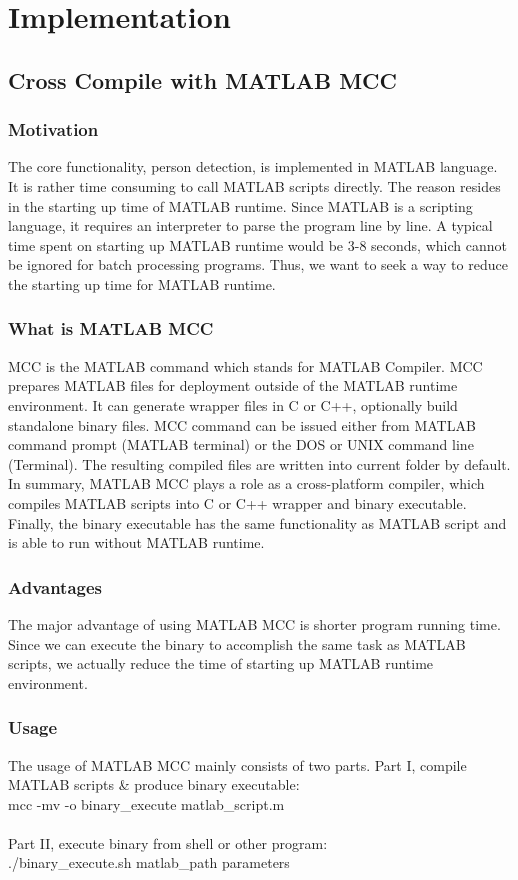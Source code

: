 \section{Implementation}
\label{sec:sec_algorithm}

\subsection{Cross Compile with MATLAB MCC}
\subsubsection{Motivation}
The core functionality, person detection, is implemented in MATLAB language. It
is rather time consuming to call MATLAB scripts directly. The reason resides in 
the starting up time of MATLAB runtime. Since MATLAB is a scripting language, 
it requires an interpreter to parse the program line by line. A typical time 
spent on starting up MATLAB runtime would be 3-8 seconds, which cannot be
ignored for batch processing programs. Thus, we want to seek a way to reduce 
the starting up time for MATLAB runtime.

\subsubsection{What is MATLAB MCC}
MCC is the MATLAB command which stands for MATLAB Compiler. MCC prepares MATLAB 
files for deployment outside of the MATLAB runtime environment. It can generate 
wrapper files in C or C++, optionally build standalone binary files.
MCC command can be issued either from MATLAB command prompt (MATLAB terminal) or
the DOS or UNIX command line (Terminal). The resulting compiled files are
written  into current folder by default.
In summary, MATLAB MCC plays a role as a cross-platform compiler, which compiles
MATLAB scripts into C or C++ wrapper and binary executable. Finally, the binary 
executable has the same functionality as MATLAB script and is able to run without MATLAB runtime.

\subsubsection{Advantages}
The major advantage of using MATLAB MCC is shorter program running time. Since
we can execute the binary to accomplish the same task as MATLAB scripts, we
actually reduce the time of starting up MATLAB runtime environment.

\subsubsection{Usage}
The usage of MATLAB MCC mainly consists of two parts. 
Part I, compile MATLAB scripts \& produce binary executable: \\
mcc -mv -o binary\_execute  matlab\_script.m \\\\
Part II, execute binary from shell or other program: \\	
./binary\_execute.sh matlab\_path parameters


